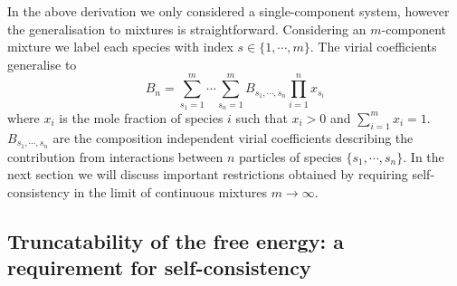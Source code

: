 In the above derivation we only considered a single-component system, however the generalisation to mixtures is straightforward.
Considering an $m$-component mixture we label each species with index $s \in \{1, \cdots, m\}$.
The virial coefficients generalise to \cite{Santos2016}
\begin{equation}\label{eq:virial-coefficients-mixtures}
  B_n =
  \sum_{s_1=1}^m \cdots \sum_{s_n=1}^m
  B_{s_1, \cdots, s_n} \prod_{i=1}^n x_{s_i}
\end{equation}
where $x_i$ is the mole fraction of species $i$ such that $x_i > 0$ and $\sum_{i=1}^m x_i = 1$.
$B_{s_1, \cdots, s_n}$ are the composition independent virial coefficients describing the contribution from interactions between $n$ particles of species $\{s_1, \cdots, s_n\}$.
In the next section we will discuss important restrictions obtained by requiring self-consistency in the limit of continuous mixtures $m \to \infty$.

\subsection{Truncatability of the free energy: a requirement for self-consistency}
\label{sec:truncatable-free-energy}

